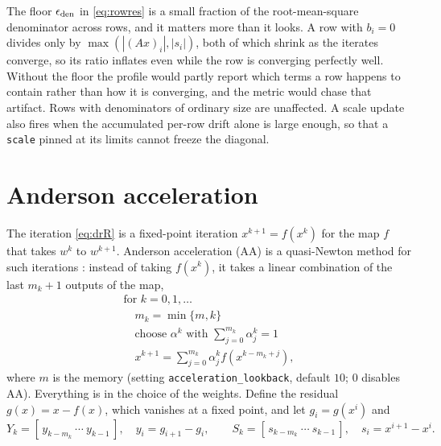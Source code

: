 \documentclass[11pt,a4paper]{article}
\theoremstyle{plain}
\begin{document}
The floor $\epsilon_{\rm den}$ in \eqref{eq:rowres} is a small fraction of the
root-mean-square denominator across rows, and it matters more than it looks. A
row with $b_i = 0$ divides only by $\max(|(Ax)_i|, |s_i|)$, both of which
shrink as the iterates converge, so its ratio inflates even while the row is
converging perfectly well. Without the floor the profile would partly report
which terms a row happens to contain rather than how it is converging, and the
metric would chase that artifact. Rows with denominators of ordinary size are
unaffected. A scale update also fires when the accumulated per-row drift alone
is large enough, so that a \texttt{scale} pinned at its limits cannot freeze
the diagonal.

\section{Anderson acceleration}\label{sec:aa}

The iteration \eqref{eq:drR} is a fixed-point iteration $x^{k+1} = f(x^k)$ for
the map $f$ that takes $w^k$ to $w^{k+1}$. Anderson acceleration (AA) is a
quasi-Newton method for such iterations \cite{anderson:65}: instead of taking
$f(x^k)$, it takes a linear combination of the last $m_k + 1$ outputs of the
map,
\begin{equation}\label{eq:aa}
\begin{array}{l}
\text{for } k = 0, 1, \dots \\
\quad m_k = \min\{m, k\} \\
\quad \text{choose } \alpha^k \text{ with } \sum_{j=0}^{m_k}\alpha^k_j = 1 \\
\quad x^{k+1} = \sum_{j=0}^{m_k}\alpha^k_j f(x^{k-m_k+j}) ,
\end{array}
\end{equation}
where $m$ is the memory (setting \texttt{acceleration\_lookback}, default
$10$; $0$ disables AA). Everything is in the choice of the weights. Define the
residual $g(x) = x - f(x)$, which vanishes at a fixed point, and let
$g_i = g(x^i)$ and
\[
Y_k = [\,y_{k-m_k}\ \cdots\ y_{k-1}\,],\quad y_i = g_{i+1} - g_i,
\qquad
S_k = [\,s_{k-m_k}\ \cdots\ s_{k-1}\,],\quad s_i = x^{i+1} - x^i .
\]
\end{document}
